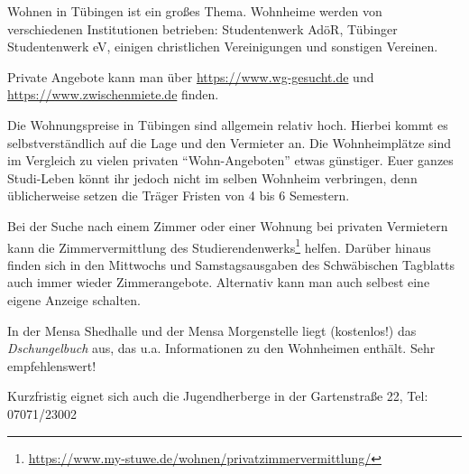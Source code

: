 Wohnen in Tübingen ist ein großes Thema.  Wohnheime werden von verschiedenen Institutionen betrieben: Studentenwerk AdöR, Tübinger Studentenwerk eV, einigen christlichen Vereinigungen und sonstigen Vereinen. 

Private Angebote kann man über \url{https://www.wg-gesucht.de} und \url{https://www.zwischenmiete.de} finden.

Die Wohnungspreise in Tübingen sind allgemein relativ hoch. Hierbei kommt es selbstverständlich auf die Lage und den Vermieter an. Die Wohnheimplätze sind im Vergleich zu vielen privaten "`Wohn-Angeboten"' etwas günstiger.  Euer ganzes Studi-Leben könnt ihr jedoch nicht im selben Wohnheim verbringen, denn üblicherweise setzen die Träger Fristen von 4 bis 6 Semestern.

Bei der Suche nach einem Zimmer oder einer Wohnung bei privaten Vermietern kann die Zimmervermittlung des Studierendenwerks\footnote{\url{https://www.my-stuwe.de/wohnen/privatzimmervermittlung/}} helfen. Darüber hinaus finden sich in den Mittwochs und Samstagsausgaben des Schwäbischen Tagblatts auch immer wieder Zimmerangebote. Alternativ kann man auch selbest eine eigene Anzeige schalten.

In der Mensa Shedhalle und der Mensa Morgenstelle liegt (kostenlos!) das \emph{Dschungelbuch} aus, das u.a. Informationen zu den Wohnheimen enthält. Sehr empfehlenswert!

Kurzfristig eignet sich auch die Jugendherberge in der Gartenstraße 22, Tel: 07071/23002
